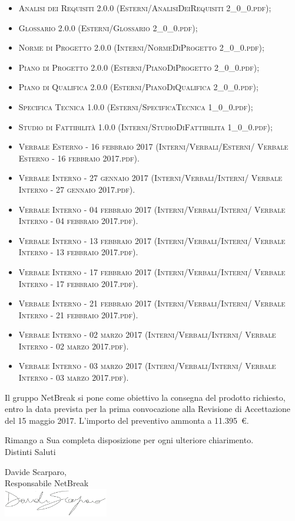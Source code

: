 \documentclass[11pt,a4paper]{letter}
\begin{document}
\begin{letter}
\begin{itemize}
	\item \textsc{Analisi dei Requisiti 2.0.0 (Esterni/AnalisiDeiRequisiti 2\_0\_0.pdf)}; 
	\item \textsc{Glossario 2.0.0 (Esterni/Glossario 2\_0\_0.pdf)}; 
	\item \textsc{Norme di Progetto 2.0.0 (Interni/NormeDiProgetto 2\_0\_0.pdf)}; 
	\item \textsc{Piano di Progetto 2.0.0 (Esterni/PianoDiProgetto 2\_0\_0.pdf)}; 
	\item \textsc{Piano di Qualifica 2.0.0 (Esterni/PianoDiQualifica 2\_0\_0.pdf)}; 
	\item \textsc{Specifica Tecnica 1.0.0 (Esterni/SpecificaTecnica 1\_0\_0.pdf)}; 
	\item \textsc{Studio di Fattibilit\`a 1.0.0 (Interni/StudioDiFattibilita 1\_0\_0.pdf)}; 
	\item \textsc{Verbale Esterno - 16 febbraio 2017 (Interni/Verbali/Esterni/ Verbale Esterno - 16 febbraio 2017.pdf)}. 
	\item \textsc{Verbale Interno - 27 gennaio 2017 (Interni/Verbali/Interni/ Verbale Interno - 27 gennaio 2017.pdf)}. 
	\item \textsc{Verbale Interno - 04 febbraio 2017 (Interni/Verbali/Interni/ Verbale Interno - 04 febbraio 2017.pdf)}. 
	\item \textsc{Verbale Interno - 13 febbraio 2017 (Interni/Verbali/Interni/ Verbale Interno - 13 febbraio 2017.pdf)}. 
	\item \textsc{Verbale Interno - 17 febbraio 2017 (Interni/Verbali/Interni/ Verbale Interno - 17 febbraio 2017.pdf)}. 
	\item \textsc{Verbale Interno - 21 febbraio 2017 (Interni/Verbali/Interni/ Verbale Interno - 21 febbraio 2017.pdf)}. 
	\item \textsc{Verbale Interno - 02 marzo 2017 (Interni/Verbali/Interni/ Verbale Interno - 02 marzo 2017.pdf)}. 
	\item \textsc{Verbale Interno - 03 marzo 2017 (Interni/Verbali/Interni/ Verbale Interno - 03 marzo 2017.pdf)}. 

\end{itemize}
	Il gruppo NetBreak si pone come obiettivo la consegna del prodotto richiesto, entro la data prevista per la prima convocazione alla Revisione di Accettazione del 15 maggio 2017. L'importo del preventivo ammonta a \hbox{11.395 \euro{}.}

\noindent Rimango a Sua completa disposizione per ogni ulteriore chiarimento.\\
Distinti Saluti
	

\closing{Davide Scarparo,\\ Responsabile NetBreak\\ \includegraphics[width=1.8in]{DS.png}}


\end{letter}
\end{document}

